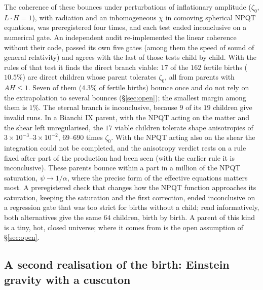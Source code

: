\documentclass[11pt,a4paper]{article}
\begin{document}
The coherence of these bounces under perturbations of inflationary amplitude ($\zeta_0$, $L\cdot H=1$), with radiation and an inhomogeneous $\chi$ in comoving spherical NPQT equations, was preregistered four times, and each test ended inconclusive on a numerical gate.
An independent audit re-implemented the linear coherence without their code, passed its own five gates (among them the speed of sound of general relativity) and agrees with the last of those tests child by child.
With the rules of that test it finds the direct branch viable: $17$ of the $162$ fertile births ($10.5\%$) are direct children whose parent tolerates $\zeta_0$, all from parents with $AH\le1$. Seven of them ($4.3\%$ of fertile births) bounce once and do not rely on the extrapolation to several bounces (\S\ref{sec:open}); the smallest margin among them is $1\%$. The eternal branch is inconclusive, because $9$ of its $19$ children give invalid runs.
In a Bianchi IX parent, with the NPQT acting on the matter and the shear left unregularised, the $17$ viable children tolerate shape anisotropies of $3\times10^{-3}$--$3\times10^{-2}$, $69$--$690$ times $\zeta_0$. With the NPQT acting also on the shear the integration could not be completed, and the anisotropy verdict rests on a rule fixed after part of the production had been seen (with the earlier rule it is inconclusive).
These parents bounce within a part in a million of the NPQT saturation, $\psi\to1/\alpha$, where the precise form of the effective equations matters most. A preregistered check that changes how the NPQT function approaches its saturation, keeping the saturation and the first correction, ended inconclusive on a regression gate that was too strict for births without a child; read informatively, both alternatives give the same $64$ children, birth by birth.
A parent of this kind is a tiny, hot, closed universe; where it comes from is the open assumption of \S\ref{sec:open}.

\subsection{A second realisation of the birth: Einstein gravity with a cuscuton}
\label{sec:cuscuton}
\end{document}
